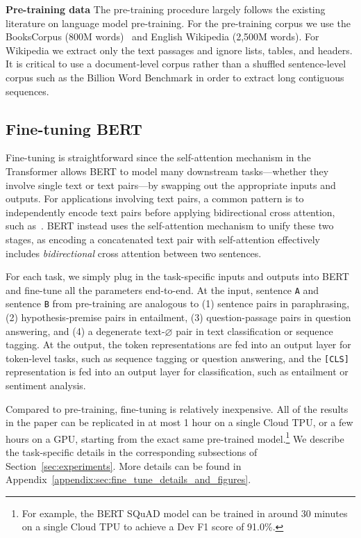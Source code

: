 \documentclass[11pt,a4paper]{article}
\begin{document}
\vspace{.3cm}
\noindent\textbf{Pre-training data}
The pre-training procedure largely follows the existing literature on language model pre-training. For the pre-training corpus we use the BooksCorpus (800M words)~\cite{zhu:2015} and English Wikipedia (2,500M words). For Wikipedia we extract only the text passages and ignore lists, tables, and headers. It is critical to use a document-level corpus rather than a shuffled sentence-level corpus such as the Billion Word Benchmark \cite{chelba-etal:2013:_one} in order to extract long contiguous sequences.

\subsection{Fine-tuning BERT}
\label{sec:finetuning_procedure}

Fine-tuning is straightforward since the self-attention mechanism in the Transformer allows BERT to model many downstream tasks---whether they involve single text or text pairs---by swapping out the appropriate inputs and outputs.
For applications involving text pairs, a common pattern is to independently encode text pairs before applying bidirectional cross attention, such as~. BERT instead uses the self-attention mechanism to unify these two stages, as encoding 
a concatenated text pair with self-attention effectively includes \emph{bidirectional} cross attention between two sentences. 


For each task, we simply plug in the task-specific inputs and outputs into BERT and fine-tune all the parameters end-to-end. 
%
At the input, sentence {\tt A} and sentence {\tt B} from pre-training are analogous to (1) sentence pairs in paraphrasing, (2) hypothesis-premise pairs in entailment, (3) question-passage pairs in question answering, and (4) a degenerate text-$\varnothing$ pair in text classification or sequence tagging. At the output, the token representations are fed into an output layer for token-level tasks, such as sequence tagging or question answering, and the {\tt [CLS]} representation is fed into an output layer for classification, such as entailment or sentiment analysis.


Compared to pre-training, fine-tuning is relatively inexpensive. All of the results in the paper can be replicated in at most 1 hour on a single Cloud TPU, or a few hours on a GPU, starting from the exact same pre-trained model.\footnote{For example, the BERT SQuAD model can be trained in around 30 minutes on a single Cloud TPU to achieve a Dev F1 score of 91.0\%.}
We describe the task-specific details in the corresponding subsections of Section~\ref{sec:experiments}. 
More details can be found in Appendix~\ref{appendix:sec:fine_tune_details_and_figures}.
\end{document}
